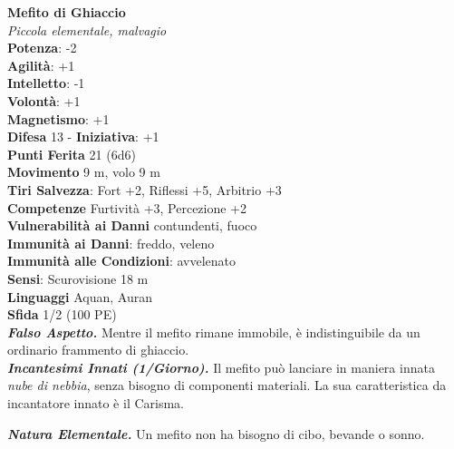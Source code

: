 \begin{multicols}{2}
\medskip\textbf{Mefito di Ghiaccio}\\
\emph{Piccola elementale, malvagio}\\
\textbf{Potenza}: -2\\
\textbf{Agilità}: +1\\
\textbf{Intelletto}: -1\\
\textbf{Volontà}: +1\\
\textbf{Magnetismo}: +1\\
\textbf{Difesa} 13 - \textbf{Iniziativa}: +1\\
\textbf{Punti Ferita} 21 (6d6)\\
\textbf{Movimento} 9 m, volo 9 m \\
\textbf{Tiri Salvezza}: Fort +2, Riflessi +5, Arbitrio +3\\
\textbf{Competenze} Furtività +3, Percezione +2\\
\textbf{Vulnerabilità ai Danni} contundenti, fuoco\\
\textbf{Immunità ai Danni}: freddo, veleno\\
\textbf{Immunità alle Condizioni}: avvelenato\\
\textbf{Sensi}: Scurovisione 18 m\\
\textbf{Linguaggi} Aquan, Auran\\
\textbf{Sfida} 1/2 (100 PE)\smallskip\\
\emph{\textbf{Falso Aspetto.}} Mentre il mefito rimane immobile, è indistinguibile da un ordinario frammento di ghiaccio.\\
\emph{\textbf{Incantesimi Innati (1/Giorno).}} Il mefito può lanciare in maniera innata \emph{nube di nebbia}, senza bisogno di componenti materiali. La sua caratteristica da incantatore innato è il Carisma.

\emph{\textbf{Natura Elementale.}} Un mefito non ha bisogno di cibo, bevande o sonno.\\


\end{multicols}
